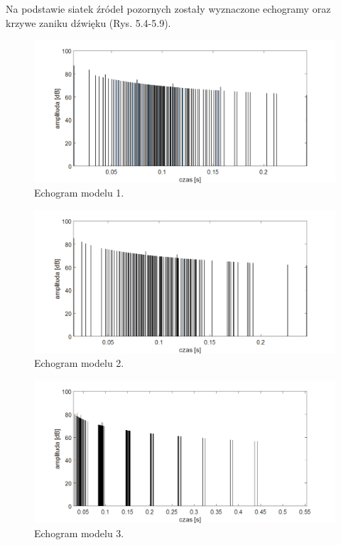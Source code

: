 Na podstawie siatek źródeł pozornych zostały wyznaczone echogramy oraz krzywe zaniku dźwięku (Rys. 5.4-5.9).

\begin{figure}[h]
        \centering
                \centering
                \includegraphics[width=16cm]{echo1}
	\caption{Echogram modelu 1.}
\end{figure}

\begin{figure}[h]
        \centering
                \centering
                \includegraphics[width=16cm]{echo2}
	\caption{Echogram modelu 2.}
\end{figure}

\begin{figure}[h]
        \centering
                \centering
                \includegraphics[width=16cm]{echo3}
	\caption{Echogram modelu 3.}
\end{figure}

